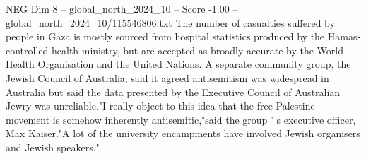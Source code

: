 \begin{textsample}{NEG Dim 8 – global\_north\_2024\_10 – Score -1.00 – global\_north\_2024\_10/115546806.txt}
The number of casualties suffered by people in Gaza is mostly sourced from hospital statistics produced by the Hamas-controlled health ministry, but are accepted as broadly accurate by the World Health Organisation and the United Nations.
A separate community group, the Jewish Council of Australia, said it agreed antisemitism was widespread in Australia but said the data presented by the Executive Council of Australian Jewry was unreliable."I really object to this idea that the free Palestine movement is somehow inherently antisemitic,"said the group ' s executive officer, Max Kaiser."A lot of the university encampments have involved Jewish organisers and Jewish speakers."

\end{textsample}
